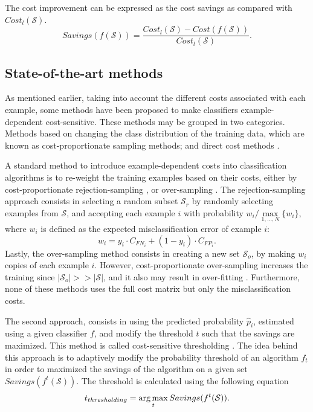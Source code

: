   The cost improvement can be expressed as the cost savings as compared with $Cost_l(\mathcal{S})$. 
  \begin{equation}\label{eq:savings}
    Savings(f(\mathcal{S})) = \frac{ Cost_l(\mathcal{S}) - Cost(f(\mathcal{S}))}
    {Cost_l(\mathcal{S})}.
  \end{equation} 


\subsection{State-of-the-art methods}

  As mentioned earlier, taking into account the different costs associated with each example, 
  some methods have been proposed to make classifiers example-dependent cost-sensitive. These 
  methods may be grouped in two categories. Methods based on changing the class distribution of 
  the training data, which are known as cost-proportionate sampling methods; and direct cost 
  methods \citep{Wang2013}.

  A standard method to introduce example-dependent costs into classification algorithms is to 
  re-weight the training examples based on their costs, either by cost-proportionate 
  rejection-sampling \citep{Zadrozny2003}, or over-sampling \citep{Elkan2001}. The 
  rejection-sampling approach consists in selecting a random subset $\mathcal{S}_{r}$  by 
  randomly  selecting examples from $\mathcal{S}$, and accepting each example $i$ with 
  probability $w_i/ \max\limits_{1,\dots, N}\{w_i\}$, where $w_i$ is defined as the expected 
  misclassification error of example $i$:
  \begin{equation}\label{eq_pred1}
    w_i = y_i\cdot C_{FN_i}+(1-y_i)\cdot C_{FP_i}.
  \end{equation}
  Lastly, the over-sampling method consists in creating a new set $\mathcal{S}_{o}$, by making 
  $w_i$ copies of each example $i$. However, cost-proportionate over-sampling increases the 
  training  since $\vert \mathcal{S}_{o}\vert >> \vert \mathcal{S} \vert$, and it also may result 
  in over-fitting  \citep{Drummond2003}. Furthermore, none of these methods uses the full cost 
  matrix but only the  misclassification costs.

  The second approach, consists in using the predicted probability $\hat p_i$, estimated using a 
  given classifier $f$, and   modify the threshold $t$  such that the savings are maximized. 
  This method is called cost-sensitive thresholding \citep{Sheng2006}. The idea behind this approach 
  is to adaptively modify the probability threshold of an algorithm $f_t$ in order to maximized the 
  savings of the algorithm on a given set $Savings(f^t(\mathcal{S}))$. The threshold is calculated 
  using the following equation
  \begin{equation}
   t_{thresholding} = \operatorname*{arg\,max}_t Savings(f^t(\mathcal{S})).
  \end{equation}

  
